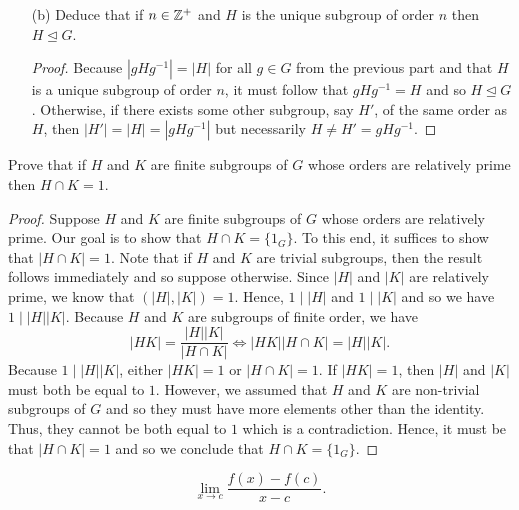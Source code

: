 \documentclass{article}
\begin{document}
\begin{problem}
\begin{enumerate}
\begin{proof}
\begin{align*}
    \end{align*}
    by multiplying by \( g  \) on the right and \( g^{-1} \) on the right and left, respectively. Hence, we see that \( \varphi  \) is an injective map. Also, it is immediate that \( \varphi  \) is surjective. Indeed, for every \( y \in g H g^{-1} \), we see (by definition of \( g H g^{-1} \)) that there exists some \( \hat{h} \in H  \) such that \( y = g \hat{h} g^{-1} =  \varphi(\hat{h}) \). Hence, \( \varphi  \) is a bijective mapping from \( H  \) to \( g H g^{-1} \). Thus, we conclude that \( | H  |  = | g H g^{-1} |  \).  
          \end{proof}
        \item[(b)] Deduce that if \( n \in \mathbb{Z}^{+} \) and \( H  \) is the unique subgroup of order \( n  \) then \( H \trianglelefteq G  \).
            \begin{proof}
               Because \( | g H g^{-1}  |  = | H  |  \) for all \( g \in G  \) from the previous part and that \( H \) is a unique subgroup of order \( n  \), it must follow that \( g H g^{-1} = H  \) and so \( H \trianglelefteq G  \). Otherwise, if there exists some other subgroup, say \( H' \), of the same order as \( H  \), then \( | H' |  = | H |  = | g H g^{-1} |  \) but necessarily \( H \neq   H' = g H g^{-1}    \).
           \end{proof}
  \end{enumerate}
\end{problem}

\begin{problem}
  Prove that if \( H  \) and \( K  \) are finite subgroups of \( G  \) whose orders are relatively prime then \( H \cap  K = 1  \).  
  \begin{proof}
  Suppose \( H  \) and \( K  \) are finite subgroups of \( G  \) whose orders are relatively prime. Our goal is to show that \( H \cap K  = \{  {1}_{G} \}  \). To this end, it suffices to show that \( | H \cap K  |  = 1   \). Note that if \( H  \) and \( K  \) are trivial subgroups, then the result follows immediately and so suppose otherwise. Since \( | H  |   \) and \( | K |  \) are relatively prime, we know that \( (| H | , | K | ) = 1  \). Hence, \( 1 \mid | H  |  \) and \( 1 \mid | K  |  \) and so we have \( 1 \mid | H  | | K |  \). Because \( H  \) and \( K  \) are subgroups of finite order, we have
  \[  | HK |  = \frac{ | H  |  | K  |   }{  | H \cap K  |  } \iff | HK | | H \cap K  |  = | H  |  | K |.  \]
  Because \( 1 \mid | H  |  | K |  \), either \( | H K  |  = 1   \) or \( | H \cap K |  = 1  \). If \( | H K  |  = 1  \), then \( | H  |   \) and \( | K  |   \) must both be equal to \( 1  \). However, we assumed that \( H  \) and \( K  \) are non-trivial subgroups of \( G  \) and so they must have more elements other than the identity. Thus, they cannot be both equal to \( 1  \) which is a contradiction. Hence, it must be that \( | H \cap K  |  = 1  \) and so we conclude that \( H \cap K = \{  {1}_{G} \}  \).
  \end{proof}
\end{problem}

\[ \lim_{x \to c} \frac{f(x) - f(c)}{x - c}. \]
\end{document}
